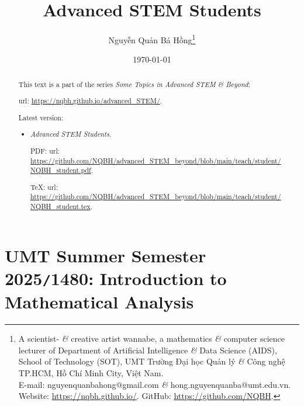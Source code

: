 \documentclass{article}
\title{Advanced STEM Students}
\author{Nguyễn Quản Bá Hồng\footnote{A scientist- {\it\&} creative artist wannabe, a mathematics {\it\&} computer science lecturer of Department of Artificial Intelligence {\it\&} Data Science (AIDS), School of Technology (SOT), UMT Trường Đại học Quản lý {\it\&} Công nghệ TP.HCM, Hồ Chí Minh City, Việt Nam.\\E-mail: {\sf nguyenquanbahong@gmail.com} {\it\&} {\sf hong.nguyenquanba@umt.edu.vn}. Website: \url{https://nqbh.github.io/}. GitHub: \url{https://github.com/NQBH}.}}
\date{\today}
\begin{document}
\maketitle
\begin{abstract}
	This text is a part of the series {\it Some Topics in Advanced STEM \& Beyond}:

	{\sc url}: \url{https://nqbh.github.io/advanced_STEM/}.

	Latest version:
	\begin{itemize}
		\item {\it Advanced STEM Students}.

		PDF: {\sc url}: \url{https://github.com/NQBH/advanced_STEM_beyond/blob/main/teach/student/NQBH_student.pdf}.

		\TeX: {\sc url}: \url{https://github.com/NQBH/advanced_STEM_beyond/blob/main/teach/student/NQBH_student.tex}.
	\end{itemize}
\end{abstract}
\tableofcontents


\section{UMT Summer Semester 2025{\tt/}1480: Introduction to Mathematical Analysis}
\end{document}
